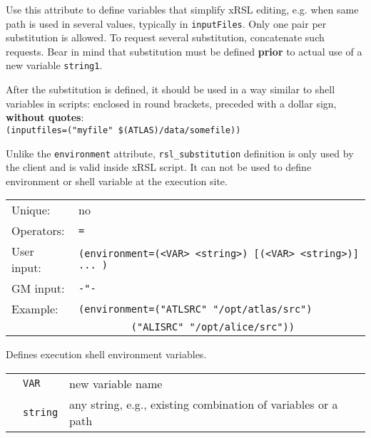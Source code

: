   Use this attribute to define variables that simplify xRSL editing,
  e.g. when same path is used in several values, typically in
  \texttt{inputFiles}. Only one pair per substitution is allowed. To
  request several substitution, concatenate such requests. Bear in
  mind that substitution must be defined \textbf{prior} to actual use
  of a new variable \texttt{string1}.

  After the substitution is defined, it should be used in a way
  similar to shell variables in scripts: enclosed in round brackets,
  preceded with a dollar sign, \textbf{without quotes}:\\
  \verb#(inputfiles=("myfile" $(ATLAS)/data/somefile))#

  Unlike the \texttt{environment} attribute, \texttt{rsl\_substitution}
  definition is only used by the client and is valid inside xRSL
  script. It can not be used to define environment or shell variable
  at the execution site.

  \hspace*{0.5cm}
  \begin{shaded}
  \end{shaded}
  \begin{tabular}{lp{13cm}}
    Unique:&no\\
    Operators:&\verb#=#\\
    User input:&\verb#(environment=(<VAR> <string>) [(<VAR> <string>)] ... )#\\
    GM input:&\verb#-"-#\\
    Example:&\verb#(environment=("ATLSRC" "/opt/atlas/src")#\\
    &\verb#         ("ALISRC" "/opt/alice/src"))#\\
  \end{tabular}

  Defines execution shell environment variables.

  \begin{tabular}{llp{10cm}}
    \hspace*{1cm}&\texttt{VAR} & new variable name\\
    \hspace*{1cm}&\texttt{string} & any string, e.g., existing combination of
    variables or a path\\
  \end{tabular}

